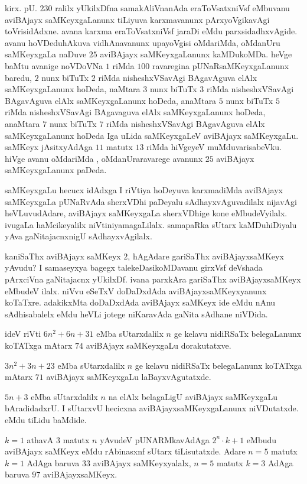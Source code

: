 kirx. pU. $230$ ralilx yUkilxDfna samakAliVnanAda eraToVsatxniVsf eMbuvanu aviBAjayx saMKeyxgaLanunx tiLiyuva karxmavanunx pArxyoVgikavAgi toVrisidAdxne. avana karxma eraToVsatxniVsf jaraDi eMdu parxsidadhxvAgide. avanu hoVDeduhAkuva vidhAnavanunx upayoVgisi oMdariMda, oMdanUru saMKeyxgaLa naDuve $25$ aviBAjayx saMKeyxgaLanunx kaMDukoMDa. heVge baMtu avanige noVDoVNa $1$ riMda $100$ ravaregina pUNaRsaMKeyxgaLanunx baredu, $2$ nunx biTuTx $2$ riMda nisheshxVSavAgi BAgavAguva elAlx saMKeyxgaLanunx hoDeda, naMtara $3$ nunx biTuTx $3$ riMda nisheshxVSavAgi BAgavAguva elAlx saMKeyxgaLanunx hoDeda, anaMtara $5$ nunx biTuTx $5$ riMda nisheshxVSavAgi BAgavaguva elAlx saMKeyxgaLanunx hoDeda, anaMtara $7$ nunx biTuTx $7$ riMda nisheshxVSavAgi BAgavAguva elAlx saMKeyxgaLanunx hoDeda Iga uLida saMKeyxgaLeV aviBAjayx saMKeyxgaLu. saMKeyx jAsitxyAdAga $11$ matutx $13$ riMda hiVgeyeV muMduvarisabeVku. hiVge avanu oMdariMda , oMdanUraravarege avanunx $25$ aviBAjayx saMKeyxgaLanunx paDeda.

saMKeyxgaLu hecucx idAdxga I riVtiya hoDeyuva karxmadiMda aviBAjayx saMKeyxgaLa pUNaRvAda sherxVDhi paDeyalu sAdhayxvAguvadilalx nijavAgi heVLuvudAdare, aviBAjayx saMKeyxgaLa sherxVDhige kone eMbudeVyilalx. ivugaLa haMcikeyalilx niVtiniyamagaLilalx. samapaRka sUtarx kaMDuhiDiyalu yAva gaNitajacnxnigU sAdhayxvAgilalx. 

kaniSaThx aviBAjayx saMKeyx $2$, hAgAdare gariSaThx aviBAjayxsaMKeyx yAvudu? I samaseyxya bagegx talekeDasikoMDavanu girxVsf deVshada pArxciVna gaNitajacnx yUkilxDf. ivana parxkAra gariSaThx aviBAjayxsaMKeyx eMbudeV ilalx. niVvu eSeTxV doDaDxdAda aviBAjayxsaMKeyxyanunx koTaTxre. adakikxMta doDaDxdAda aviBAjayx saMKeyx ide eMdu nAnu sAdhisabalelx eMdu heVLi jotege niKaravAda gaNita sAdhane niVDida.

ideV riVti $6n^2+6n+31$ eMba sUtarxdalilx $n$ ge kelavu nidiRSaTx belegaLanunx koTATxga mAtarx $74$ aviBAjayx saMKeyxgaLu dorakutatxve.

$3n^2+3n+23$ eMba sUtarxdalilx $n$ ge kelavu nidiRSaTx belegaLanunx koTATxga mAtarx $71$ aviBAjayx saMKeyxgaLu laBayxvAgutatxde.

$5n+3$ eMba sUtarxdalilx $n$ na elAlx belagaLigU aviBAjayx saMKeyxgaLu bAradidadxrU. I sUtarxvU hecicxna aviBAjayxsaMKeyxgaLanunx niVDutatxde. eMdu tiLidu baMdide.

$k=1$ athavA $3$ matutx $n$ yAvudeV pUNARMkavAdAga $2^{n}\cdot k+1$ eMbudu aviBAjayx saMKeyx eMdu rAbinasxnf sUtarx tiLisutatxde. Adare $n=5$ matutx $k=1$ AdAga baruva $33$ aviBAjayx saMKeyxyalalx, $n=5$ matutx $k=3$ AdAga baruva $97$ aviBAjayxsaMKeyx.

